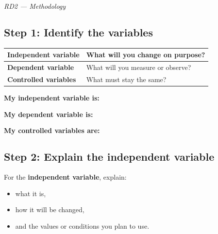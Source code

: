 \documentclass[12pt]{article}
\begin{document}
\vfill

\begin{center}
\textit{RD2 --- Methodology}
\end{center}

\newpage


\subsection*{Step 1: Identify the variables}

\begin{tabularx}{\textwidth}{|>{\bfseries}p{}|X|}
\hline
Independent variable & What will you change on purpose? \\ \hline
Dependent variable & What will you measure or observe? \\ \hline
Controlled variables & What must stay the same? \\ \hline
\end{tabularx}

\vspace{1em}

\textbf{My independent variable is:}

\vspace{1.5cm}

\textbf{My dependent variable is:}

\vspace{1.5cm}

\textbf{My controlled variables are:}

\vspace{2cm}

\subsection*{Step 2: Explain the independent variable}

\begin{tcolorbox}[colback=white,colframe=black,title=What to include]
For the \textbf{independent variable}, explain:
\begin{itemize}[leftmargin=1.5em]
    \item what it is,
    \item how it will be changed,
    \item and the values or conditions you plan to use.
\end{itemize}
\end{tcolorbox}
\end{document}
